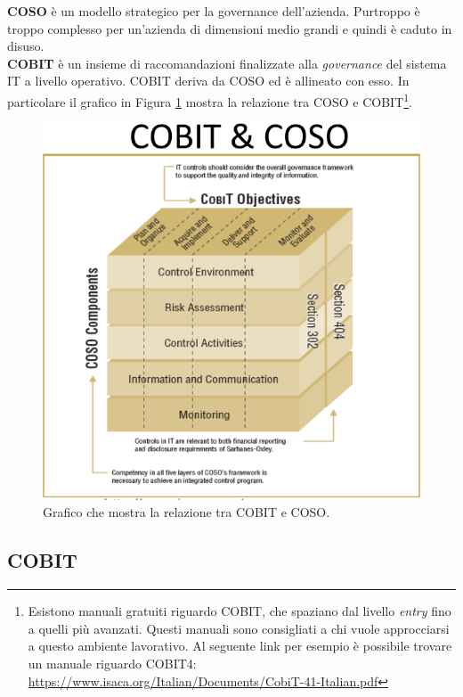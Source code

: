 \textbf{COSO} è un modello strategico per la governance dell'azienda. Purtroppo
è troppo complesso per un'azienda di dimensioni medio grandi e quindi è caduto
in disuso.\\
\newline
\textbf{COBIT} è un insieme di raccomandazioni finalizzate alla \textit{governance}
del sistema IT a livello operativo.
COBIT deriva da COSO ed è allineato con esso. In particolare il grafico in Figura
\ref{fig:cobit:coso:relazione} mostra la relazione tra COSO e COBIT\footnote{Esistono manuali gratuiti
riguardo COBIT, che spaziano dal livello \textit{entry} fino a quelli più
avanzati. Questi manuali sono consigliati a chi vuole approcciarsi a questo ambiente
lavorativo. Al seguente link per esempio è possibile trovare un manuale riguardo
COBIT4:  \url{https://www.isaca.org/Italian/Documents/CobiT-41-Italian.pdf}}.
\begin{figure}[h!]
        \begin{center}
                \includegraphics[scale=2.0]{res/img/cobit_coso_cube}
        \end{center}
        \caption{Grafico che mostra la relazione tra COBIT e COSO.}
        \label{fig:cobit:coso:relazione}
\end{figure}

\subsection{COBIT}
\label{COBIT}

